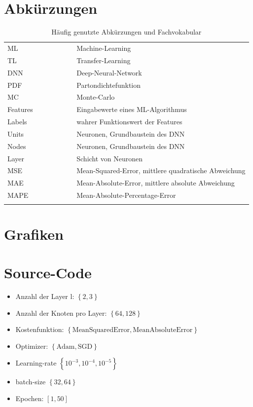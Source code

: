\section{Abkürzungen}
\begin{table}[htp]
	\centering
	\begin{tabular}{ll}
		ML $\hspace{3cm}$& Machine-Learning \\
		TL & Transfer-Learning \\
		DNN & Deep-Neural-Network \\
		PDF & Partondichtefunktion \\
		MC & Monte-Carlo \\
		Features & Eingabewerte eines ML-Algorithmus \\
		Labels & wahrer Funktionswert der Features \\
		Units & Neuronen, Grundbaustein des DNN \\
		Nodes & Neuronen, Grundbaustein des DNN \\
		Layer & Schicht von Neuronen \\
		MSE & Mean-Squared-Error, mittlere quadratische Abweichung \\
		MAE & Mean-Absolute-Error, mittlere absolute Abweichung \\
		MAPE & Mean-Absolute-Percentage-Error\\
		&\\
	\end{tabular}
	\caption{Häufig genutzte Abkürzungen und Fachvokabular}
\end{table}

\section{Grafiken}
\section{Source-Code}


%


\begin{itemize}
	\setlength\itemsep{0.1cm}
	\setlength{\parskip}{0.1cm}
	\item Anzahl der Layer l: $\left\lbrace2, 3\right\rbrace$  
	\item Anzahl der Knoten pro Layer: $\left\lbrace64, 128 \right\rbrace $
	\item Kostenfunktion: $\left\lbrace \text{MeanSquaredError}, \text{MeanAbsoluteError} \right\rbrace$
	\item Optimizer: $\left\lbrace \text{Adam}, \text{SGD} \right\rbrace$
	\item Learning-rate $\left\lbrace 10^{-3}, 10^{-4}, 10^{-5} \right\rbrace$
	\item batch-size $\left\lbrace 32, 64 \right\rbrace$
	\item Epochen: $\left[1,50\right]$
\end{itemize}

